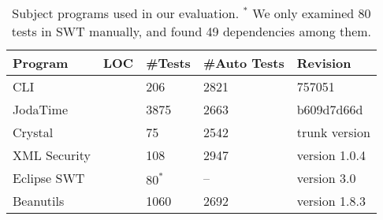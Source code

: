 
\begin{table}
\centering
\setlength{\tabcolsep}{0.5\tabcolsep}
\begin{tabular}{|l|l|l|l|l|}
\hline
\textbf{Program} & \textbf{LOC} & \textbf{\#Tests} & \textbf{\#Auto Tests} & \textbf{Revision}
\\
\hline
CLI &  & 206 
& 2821&  757051\\
JodaTime & & 3875 
& 2663 &  b609d7d66d\\
Crystal & & 75 & 2542 & trunk version\\
XML Security & & 108 & 2947 & version 1.0.4 \\ %
Eclipse SWT & & $80^*$ 
& -- 
& version 3.0 \\
Beanutils & & 1060 & 2692 & version 1.8.3 \\
\hline
\end{tabular}
\caption{Subject programs used in our evaluation. ${}^*$ We only examined 80
tests in SWT manually, and found 49 dependencies among them.%
}
\label{tab:subjects}
\end{table}
